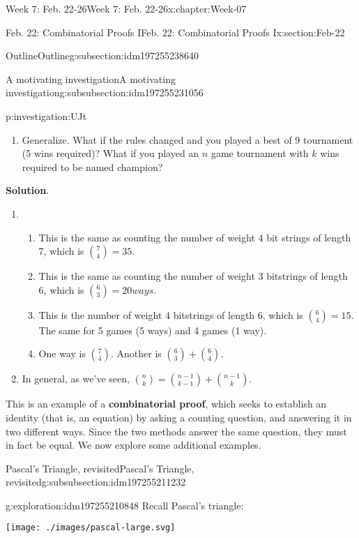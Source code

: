 \documentclass[oneside,10pt,]{book}
\newcommand{\blocktitlefont}{\relax}
\newcommand{\terminology}[1]{\textbf{#1}}
\numberwithin{equation}{section}
\begin{document}
\begin{chapterptx}{Week 7: Feb. 22-26}{}{Week 7: Feb. 22-26}{}{}{x:chapter:Week-07}
\begin{sectionptx}{Feb. 22: Combinatorial Proofs I}{}{Feb. 22: Combinatorial Proofs I}{}{}{x:section:Feb-22}
\begin{subsectionptx}{Outline}{}{Outline}{}{}{g:subsection:idm197255238640}
\begin{subsubsectionptx}{A motivating investigation}{}{A motivating investigation}{}{}{g:subsubsection:idm197255231056}
\begin{investigation}{}{p:investigation:UJt}
\begin{enumerate}
\begin{enumerate}
\end{enumerate}
%
\item{}Generalize. What if the rules changed and you played a best of \(9\) tournament (5 wins required)? What if you played an \(n\) game tournament with \(k\) wins required to be named champion?%
\end{enumerate}
%
\par\smallskip%
\noindent\textbf{\blocktitlefont Solution}.\hypertarget{g:solution:idm197255217088}{}\quad{}%
\begin{enumerate}
\item{}%
\begin{enumerate}
\item{}This is the same as counting the number of weight 4 bit strings of length 7, which is \(\binom{7}{4} = 35\).%
\item{}This is the same as counting the number of weight 3 bitstrings of length 6, which is \(\binom{6}{3} = 20 ways\).%
\item{}This is the number of weight 4 bitstrings of length 6, which is \(\binom{6}{4} = 15\). The same for 5 games (5 ways) and 4 games (1 way).%
\item{}One way is \(\binom{7}{4}\). Another is \(\binom{6}{3} + \binom{6}{4}\).%
\end{enumerate}
%
\item{}In general, as we've seen, \(\binom{n}{k} = \binom{n-1}{k-1}+\binom{n-1}{k}\).%
\end{enumerate}
\end{investigation}%
This is an example of a \terminology{combinatorial proof}, which seeks to establish an identity (that is, an equation) by asking a counting question, and answering it in two different ways. Since the two methods answer the same question, they must in fact be equal. We now explore some additional examples.%
\end{subsubsectionptx}
%
%
\typeout{************************************************}
\typeout{************************************************}
%
\begin{subsubsectionptx}{Pascal's Triangle, revisited}{}{Pascal's Triangle, revisited}{}{}{g:subsubsection:idm197255211232}
\begin{exploration}{}{g:exploration:idm197255210848}%
Recall Pascal's triangle:%
\begin{image}{0}{1}{0}%
\texttt{[image: ./images/pascal-large.svg]}
\end{image}%

\end{exploration}
\end{subsubsectionptx}
\end{subsectionptx}
\end{sectionptx}
\end{chapterptx}
\end{document}
